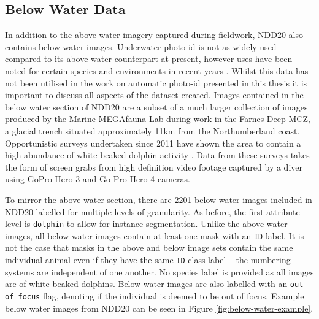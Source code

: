 \subsection{Below Water Data}\label{ch:NDD,sec:NDD20,sub:belowWaterData}

In addition to the above water imagery captured during fieldwork, NDD20 also contains below water images. Underwater photo-id is not as widely used compared to its above-water counterpart at present, however uses have been noted for certain species and environments in recent years \cite{van_bressem_visual_2018, veronique_underwater_2022}. Whilst this data has not been utilised in the work on automatic photo-id presented in this thesis it is important to discuss all aspects of the dataset created. Images contained in the below water section of NDD20 are a subset of a much larger collection of images produced by the Marine MEGAfauna Lab during work in the Farnes Deep MCZ, a glacial trench situated approximately 11km from the Northumberland coast. Opportunistic surveys undertaken since 2011 have shown the area to contain a high abundance of white-beaked dolphin activity \cite{van_bressem_visual_2018}. Data from these surveys takes the form of screen grabs from high definition video footage captured by a diver using GoPro Hero 3 and Go Pro Hero 4 cameras. 

To mirror the above water section, there are 2201 below water images included in NDD20 labelled for multiple levels of granularity. As before, the first attribute level is \texttt{dolphin} to allow for instance segmentation. Unlike the above water images, all below water images contain at least one mask with an \texttt{ID} label. It is not the case that masks in the above and below image sets contain the same individual animal even if they have the same \texttt{ID} class label -- the numbering systems are independent of one another. No species label is provided as all images are of white-beaked dolphins. Below water images are also labelled with an \texttt{out of focus} flag, denoting if the individual is deemed to be out of focus. Example below water images from NDD20 can be seen in Figure \ref{fig:below-water-example}.

